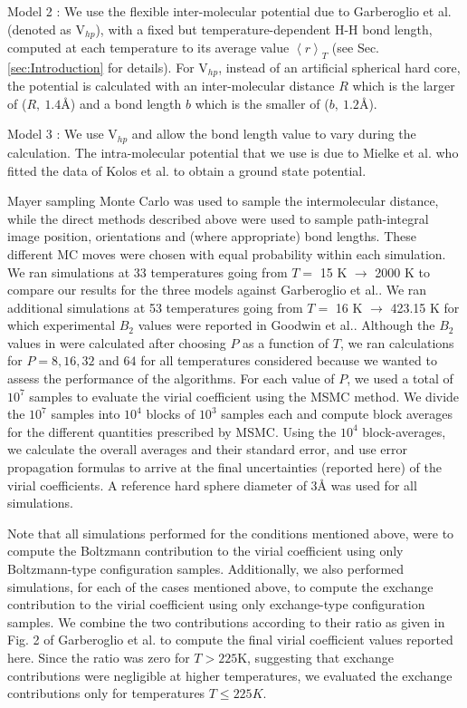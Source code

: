         Model 2 : We use the flexible inter-molecular potential due to Garberoglio et al.\cite{Garberoglio2012} (denoted as V$_{hp}$), with a fixed but temperature-dependent H-H bond length, computed at each temperature to its average value $\left< r \right>_T$ (see Sec. \ref{sec:Introduction} for details). For V$_{hp}$, instead of an artificial spherical hard core, the potential is calculated with an inter-molecular distance $R$ which is the larger of ($R,\: 1.4${\AA}) and a bond length $b$ which is the smaller of ($b,\: 1.2${\AA}).

        Model 3 : We use V$_{hp}$ and allow the bond length value to vary during the calculation. The intra-molecular potential that we use is due to Mielke et al.\cite{Mielke2002} who fitted the data of Kolos et al.\cite{Kolos1986} to obtain a ground state potential. 
        
        Mayer sampling Monte Carlo was used to sample the intermolecular distance, while the direct methods described above were used to sample path-integral image position, orientations and (where appropriate) bond lengths. These different MC moves were chosen with equal probability within each simulation. We ran simulations at 33 temperatures going from $T =$ 15 K $\to$ 2000 K to compare our results for the three models against Garberoglio et al.\cite{Garberoglio2014}. We ran additional simulations at 53 temperatures going from $T =$ 16 K $\to$ 423.15 K for which experimental $B_2$ values were reported in Goodwin et al.\cite{Goodwin1963}. Although the $B_2$ values in \cite{Garberoglio2014} were calculated after choosing $P$ as a function of $T$, we ran calculations for $P = 8, 16, 32$ and $64$ for all temperatures considered because we wanted to assess the performance of the algorithms. For each value of $P$, we used a total of $10^7$ samples to evaluate the virial coefficient using the MSMC\cite{Singh2004} method. We divide the $10^7$ samples into $10^4$ blocks of $10^3$ samples each and compute block averages for the different quantities prescribed by MSMC. Using the $10^4$ block-averages, we calculate the overall averages and their standard error, and use error propagation formulas to arrive at the final uncertainties (reported here) of the virial coefficients. A reference hard sphere diameter of 3{\AA} was used for all simulations.
        
        Note that all simulations performed for the conditions mentioned above, were to compute the Boltzmann contribution to the virial coefficient using only Boltzmann-type configuration samples. Additionally, we also performed simulations, for each of the cases mentioned above, to compute the exchange contribution to the virial coefficient using only exchange-type configuration samples. We combine the two contributions according to their ratio as given in Fig. 2 of Garberoglio et al. \cite{Garberoglio2014} to compute the final virial coefficient values reported here. Since the ratio was zero for $T > 225$K, suggesting that exchange contributions were negligible at higher temperatures, we evaluated the exchange contributions only for temperatures $T \le 225K$. 

